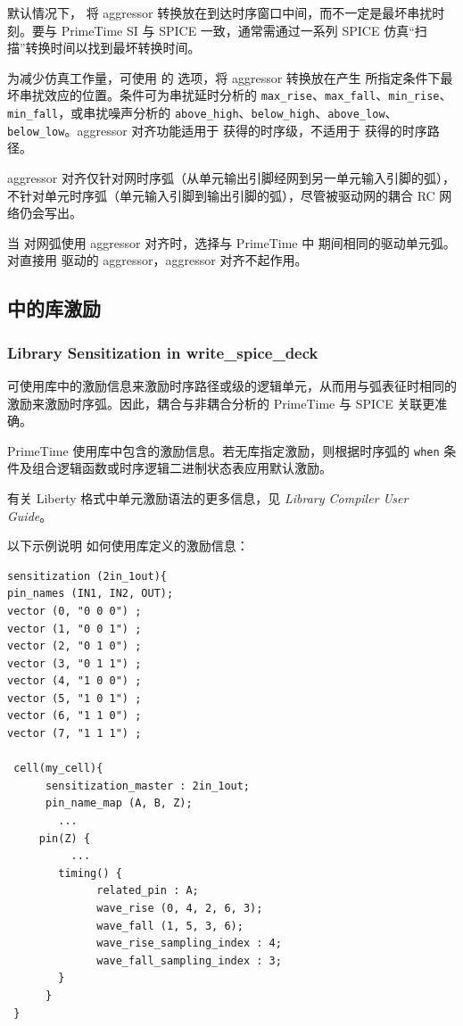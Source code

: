 
默认情况下， 将 aggressor 转换放在到达时序窗口中间，而不一定是最坏串扰时刻。要与 PrimeTime SI 与 SPICE 一致，通常需通过一系列 SPICE 仿真“扫描”转换时间以找到最坏转换时间。

为减少仿真工作量，可使用  的  选项，将 aggressor 转换放在产生  所指定条件下最坏串扰效应的位置。条件可为串扰延时分析的 \texttt{max\_rise}、\texttt{max\_fall}、\texttt{min\_rise}、\texttt{min\_fall}，或串扰噪声分析的 \texttt{above\_high}、\texttt{below\_high}、\texttt{above\_low}、\texttt{below\_low}。aggressor 对齐功能适用于  获得的时序级，不适用于  获得的时序路径。

aggressor 对齐仅针对网时序弧（从单元输出引脚经网到另一单元输入引脚的弧），不针对单元时序弧（单元输入引脚到输出引脚的弧），尽管被驱动网的耦合 RC 网络仍会写出。

当  对网弧使用 aggressor 对齐时，选择与 PrimeTime 中  期间相同的驱动单元弧。对直接用  驱动的 aggressor，aggressor 对齐不起作用。

\subsection{ 中的库激励}
\subsubsection*{Library Sensitization in write\_spice\_deck}

 可使用库中的激励信息来激励时序路径或级的逻辑单元，从而用与弧表征时相同的激励来激励时序弧。因此，耦合与非耦合分析的 PrimeTime 与 SPICE 关联更准确。

PrimeTime 使用库中包含的激励信息。若无库指定激励，则根据时序弧的 \texttt{when} 条件及组合逻辑函数或时序逻辑二进制状态表应用默认激励。

有关 Liberty 格式中单元激励语法的更多信息，见 \textit{Library Compiler User Guide}。

以下示例说明  如何使用库定义的激励信息：
\begin{lstlisting}
sensitization (2in_1out){
pin_names (IN1, IN2, OUT);
vector (0, "0 0 0") ;
vector (1, "0 0 1") ;
vector (2, "0 1 0") ;
vector (3, "0 1 1") ;
vector (4, "1 0 0") ;
vector (5, "1 0 1") ;
vector (6, "1 1 0") ;
vector (7, "1 1 1") ;

 cell(my_cell){
      sensitization_master : 2in_1out;
      pin_name_map (A, B, Z);
        ...
     pin(Z) {
          ...
        timing() {
              related_pin : A;
              wave_rise (0, 4, 2, 6, 3);
              wave_fall (1, 5, 3, 6);
              wave_rise_sampling_index : 4;
              wave_fall_sampling_index : 3;
        }
      }
 }
\end{lstlisting}

